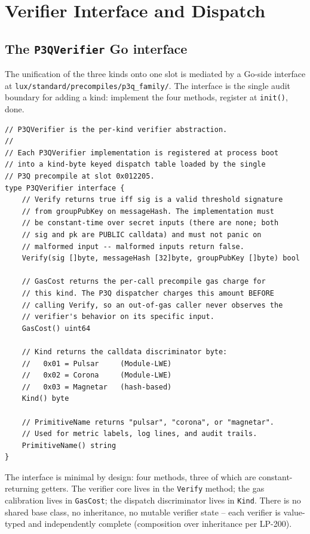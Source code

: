 \section{Verifier Interface and Dispatch}
\label{sec:verifier-interface}

\subsection{The \texttt{P3QVerifier} Go interface}

The unification of the three kinds onto one slot is mediated by
a Go-side interface at
\texttt{lux/standard/precompiles/p3q\_family/}. The interface is
the single audit boundary for adding a kind: implement the four
methods, register at \texttt{init()}, done.

\begin{lstlisting}[language={}]
// P3QVerifier is the per-kind verifier abstraction.
//
// Each P3QVerifier implementation is registered at process boot
// into a kind-byte keyed dispatch table loaded by the single
// P3Q precompile at slot 0x012205.
type P3QVerifier interface {
    // Verify returns true iff sig is a valid threshold signature
    // from groupPubKey on messageHash. The implementation must
    // be constant-time over secret inputs (there are none; both
    // sig and pk are PUBLIC calldata) and must not panic on
    // malformed input -- malformed inputs return false.
    Verify(sig []byte, messageHash [32]byte, groupPubKey []byte) bool

    // GasCost returns the per-call precompile gas charge for
    // this kind. The P3Q dispatcher charges this amount BEFORE
    // calling Verify, so an out-of-gas caller never observes the
    // verifier's behavior on its specific input.
    GasCost() uint64

    // Kind returns the calldata discriminator byte:
    //   0x01 = Pulsar     (Module-LWE)
    //   0x02 = Corona     (Module-LWE)
    //   0x03 = Magnetar   (hash-based)
    Kind() byte

    // PrimitiveName returns "pulsar", "corona", or "magnetar".
    // Used for metric labels, log lines, and audit trails.
    PrimitiveName() string
}
\end{lstlisting}

The interface is minimal by design: four methods, three of which
are constant-returning getters. The verifier core lives in the
\texttt{Verify} method; the gas calibration lives in
\texttt{GasCost}; the dispatch discriminator lives in
\texttt{Kind}. There is no shared base class, no inheritance, no
mutable verifier state -- each verifier is value-typed and
independently complete (composition over inheritance per
LP-200).

